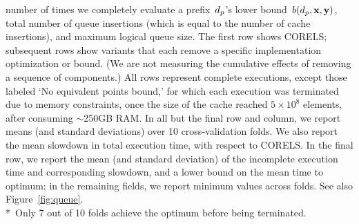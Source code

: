 \begin{table}[t!]
{number of times we completely evaluate a prefix~$d_p$'s lower bound~$b(d_p, \mathbf{x}, \mathbf{y})$,
total number of queue insertions (which is equal to the number of cache insertions),
and maximum logical queue size.
%
The first row shows CORELS; subsequent rows show variants
that each remove a specific implementation optimization or bound.
%
(We are not measuring the cumulative effects of removing a sequence of components.)
%
All rows represent complete executions, except those labeled `No equivalent points bound,'
for which each execution was terminated due to memory constraints,
once the size of the cache reached ${5 \times 10^8}$ elements,
after consuming $\sim$250GB RAM.
%
In all but the final row and column, we report means
(and standard deviations) over 10 cross-validation folds.
%
We also report the  mean slowdown in total execution time,
with respect to CORELS.
%
In the final row, we report the mean (and standard deviation) of the
incomplete execution time and corresponding slowdown,
and a lower bound on the mean time to optimum;
in the remaining fields, we report minimum values across folds.
%
See also Figure~\ref{fig:queue}. \\
%
*~Only 7 out of 10 folds achieve the optimum before being terminated.
}
\vspace{4mm}
\label{tab:ablation}
\end{table}

